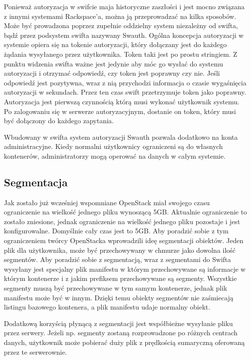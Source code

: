 Ponieważ autoryzacja w swifcie maja historyczne zaszłości i jest mocno związana z innymi systemami Rackspace'a, można ją przeprowadzać na kilka sposobów. Może być prowadzona poprzez zupełnie oddzielny system niezależny od swifta, bądź przez podsystem swifta nazywany Swauth. Ogólna koncepcja autoryzacji w systemie opiera się na tokenie autoryzacji, który dołączany jest do każdego żądania wysyłanego przez użytkownika. Token taki jest po prostu stringiem. Z punktu widzenia swifta ważne jest jedynie aby móc go wysłać do systemu autoryzacji i otrzymać odpowiedź, czy token jest poprawny czy nie. Jeśli odpowiedź jest pozytywna, wraz z nią przychodzi informacja o czasie wygaśnięcia autoryzacji w sekundach. Przez ten czas swift przetrzymuje token jako poprawny. Autoryzacja jest pierwszą czynnością którą musi wykonać użytkownik systemu. Po zalogowaniu się w serwerze autoryzacyjnym, dostanie on token, który musi być dołączony do każdego zapytania.

Wbudowany w swifta system autoryzacji Swauth pozwala dodatkowo na konta administracyjne. Kiedy normalni użytkownicy ograniczeni są do własnych kontenerów, administratorzy mogą operować na danych w całym systemie.

\subsection{Segmentacja}\label{sec:segmentacja}

Jak zostało już wcześniej wspomniane OpenStack miał swojego czasu ograniczenie na wielkość jednego pliku wynoszącą 5GB. Aktualnie ograniczenie to zostało zniesione, jednak ograniczenie na wielkość jednego pliku pozostaje i jest konfigurowalne. Domyślnie cały czas jest to 5GB. Aby poradzić sobie z tym ograniczeniem twórcy OpenStacka wprowadzili ideę segmentacji obiektów. Jeden plik dla użytkownika, może być przechowywany w chmurze jako dowolna ilość segmentów. Aby poradzić sobie z segmentacją, wraz z segmentami do Swifta wysyłany jest specjalny plik manifestu w którym przechowywane są informacje w którym kontenerze i z jakim prefiksem przechowywane są segmenty. Wszystkie segmenty muszą być przechowywane w tym samym kontenerze, jednak plik manifestu może być w innym. Dzięki temu obiekty segmentów nie zaśmiecają listingu bazowego kontenera, a plik manifestu udaje normalny obiekt.

Dodatkową korzyścią płynącą z segmentacji jest współbieżne wysyłanie pliku przez serwery. Jeżeli np. segmenty zostaną rozprowadzone po różnych centrach danych, użytkownik może pobierać duży plik z prędkością sumaryczną oferowaną przez te serwerownie.


